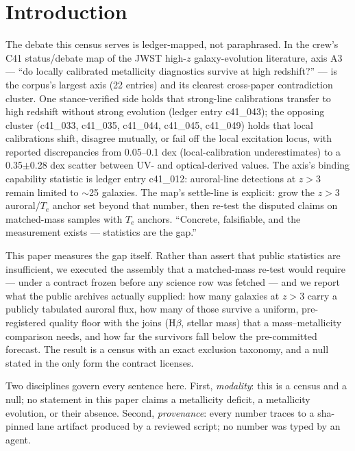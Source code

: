\documentclass[twocolumn]{aastex702}
\newcommand{\te}{$T_e$}
\begin{document}

\section{Introduction}\label{sec:intro}

The debate this census serves is ledger-mapped, not paraphrased. In the crew's C41
status/debate map of the JWST high-$z$ galaxy-evolution literature, axis A3 —
``do locally calibrated metallicity diagnostics survive at high redshift?'' — is the
corpus's largest axis (22 entries) and its clearest cross-paper contradiction
cluster. One stance-verified side holds that strong-line calibrations transfer to
high redshift without strong evolution (ledger entry c41\_043); the opposing cluster
(c41\_033, c41\_035, c41\_044, c41\_045, c41\_049) holds that local calibrations
shift, disagree mutually, or fail off the local excitation locus, with reported
discrepancies from 0.05--0.1 dex (local-calibration underestimates) to a
0.35$\pm$0.28 dex scatter between UV- and optical-derived values. The axis's binding
capability statistic is ledger entry c41\_012: auroral-line detections at $z>3$
remain limited to $\sim$25 galaxies. The map's settle-line is explicit: grow the
$z>3$ auroral/\te{} anchor set beyond that number, then re-test the disputed claims
on matched-mass samples with \te{} anchors. ``Concrete, falsifiable, and the
measurement exists --- statistics are the gap.''

This paper measures the gap itself. Rather than assert that public statistics are
insufficient, we executed the assembly that a matched-mass re-test would require —
under a contract frozen before any science row was fetched — and we report what the
public archives actually supplied: how many galaxies at $z>3$ carry a
publicly tabulated auroral flux, how many of those survive a uniform, pre-registered
quality floor with the joins (H$\beta$, stellar mass) that a mass--metallicity
comparison needs, and how far the survivors fall below the pre-committed forecast.
The result is a census with an exact exclusion taxonomy, and a null stated in the
only form the contract licenses.

Two disciplines govern every sentence here. First, \emph{modality}: this is a census
and a null; no statement in this paper claims a metallicity deficit, a metallicity
evolution, or their absence. Second, \emph{provenance}: every number traces to a
sha-pinned lane artifact produced by a reviewed script; no number was typed by an
agent.
\end{document}
